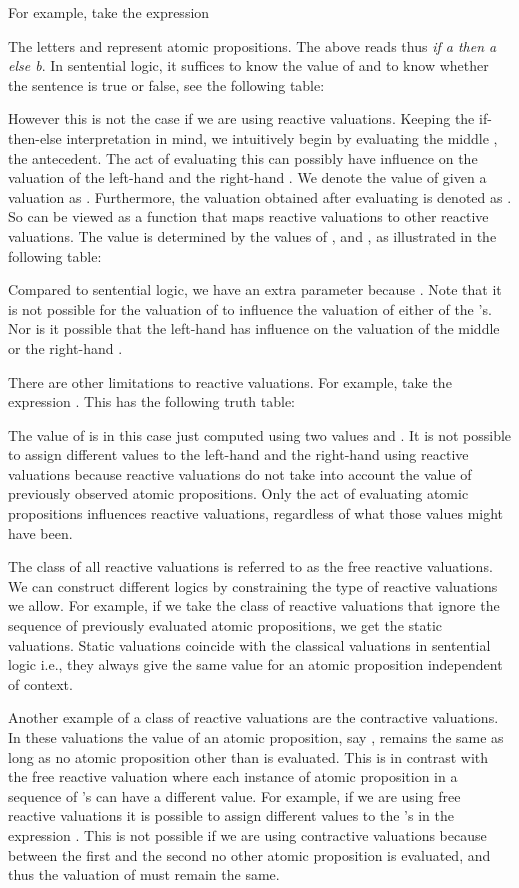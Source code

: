 \documentclass[a4paper,twoside,openright]{report}
\begin{document}
For example, take the expression

The letters  and  represent atomic propositions. The above reads thus \emph{if a then a else b}. In sentential logic, it suffices to know the value of  and  to know whether the sentence is true or false, see the following table:

However this is not the case if we are using reactive valuations. Keeping the if-then-else interpretation in mind, we intuitively begin by evaluating the middle , the antecedent. The act of evaluating this  can possibly have influence on the valuation of the left-hand  and the right-hand . We denote the value of  given a valuation  as . Furthermore, the valuation obtained after evaluating  is denoted as . So  can be viewed as a function that maps reactive valuations to other reactive valuations. The value  is determined by the values of ,  and , as illustrated in the following table: 

Compared to sentential logic, we have an extra parameter because . Note that it is not possible for the valuation of  to influence the valuation of either of the 's. Nor is it possible that the left-hand  has influence on the valuation of the middle  or the right-hand .

There are other limitations to reactive valuations. For example, take the expression . This has the following truth table:

The value of  is in this case just computed using two values  and . It is not possible to assign different values to the left-hand  and the right-hand  using reactive valuations because reactive valuations do not take into account the value of previously observed atomic propositions. Only the act of evaluating atomic propositions influences reactive valuations, regardless of what those values might have been.

The class of all reactive valuations is referred to as the free reactive valuations. We can construct different logics by constraining the type of reactive valuations we allow. For example, if we take the class of reactive valuations that ignore the sequence of previously evaluated atomic propositions, we get the static valuations. Static valuations coincide with the classical valuations in sentential logic i.e., they always give the same value for an atomic proposition independent of context.

Another example of a class of reactive valuations are the contractive valuations. In these valuations the value of an atomic proposition, say , remains the same as long as no atomic proposition other than  is evaluated. This is in contrast with the free reactive valuation where each instance of atomic proposition  in a sequence of 's can have a different value. For example, if we are using free reactive valuations it is possible to assign different values to the 's in the expression . This is not possible if we are using contractive valuations because between the first  and the second  no other atomic proposition is evaluated, and thus the valuation of  must remain the same.
\end{document}
